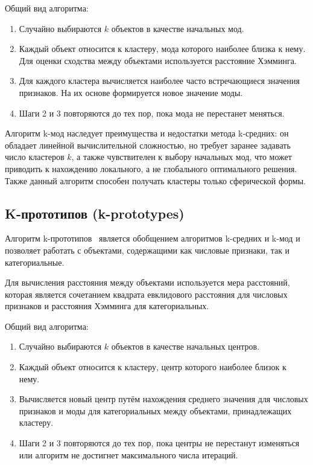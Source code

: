 Общий вид алгоритма:
\begin{enumerate}
	\item Случайно выбираются $k$ объектов в качестве начальных мод.
	\item Каждый объект относится к кластеру, мода которого наиболее близка к нему. Для оценки сходства между объектами используется расстояние Хэмминга.
	\item Для каждого кластера вычисляется наиболее часто встречающиеся значения признаков. На их основе формируется новое значение моды.
	\item Шаги 2 и 3 повторяются до тех пор, пока мода не перестанет меняться.
\end{enumerate}

Алгоритм k-мод наследует преимущества и недостатки метода k-средних: он обладает линейной вычислительной сложностью, но требует заранее задавать число кластеров $k$, а также чувствителен к выбору начальных мод, что может приводить к нахождению локального, а не глобального оптимального решения. Также данный алгоритм способен получать кластеры только сферической формы.

\subsection{K-прототипов (k-prototypes)}
Алгоритм k-прототипов~\cite{k_prototypes} является обобщением алгоритмов k-средних и k-мод и позволяет работать с объектами, содержащими как числовые признаки, так и категориальные.

Для вычисления расстояния между объектами используется мера расстояний, которая является сочетанием квадрата евклидового расстояния для числовых признаков и расстояния Хэмминга для категориальных.

Общий вид алгоритма:
\begin{enumerate}
	\item Случайно выбираются $k$ объектов в качестве начальных центров.
	\item Каждый объект относится к кластеру, центр которого наиболее близок к нему.
	\item Вычисляется новый центр путём нахождения среднего значения для числовых признаков и моды для категориальных между объектами, принадлежащих кластеру.
	\item Шаги 2 и 3 повторяются до тех пор, пока центры не перестанут изменяться или алгоритм не достигнет максимального числа итераций.
\end{enumerate}

